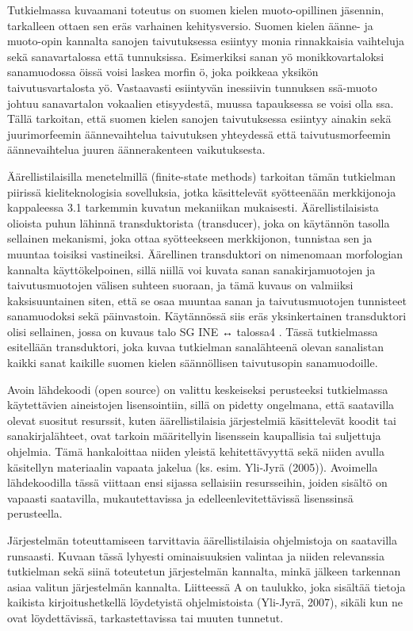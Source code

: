 \documentclass[free]{flammie}
\begin{document}
Tutkielmassa kuvaamani toteutus
on suomen kielen muoto-opillinen jäsennin, tarkalleen ottaen sen eräs varhainen
kehitysversio. Suomen kielen äänne- ja muoto-opin kannalta sanojen taivutuksessa
esiintyy monia rinnakkaisia vaihteluja sekä sanavartalossa että tunnuksissa.
Esimerkiksi sanan yö monikkovartaloksi sanamuodossa öissä voisi laskea morfin ö,
joka poikkeaa yksikön taivutusvartalosta yö. Vastaavasti esiintyvän inessiivin
tunnuksen ssä-muoto johtuu sanavartalon vokaalien etisyydestä, muussa
tapauksessa se voisi olla ssa. Tällä tarkoitan, että suomen kielen sanojen
taivutuksessa esiintyy ainakin sekä juurimorfeemin äännevaihtelua taivutuksen
yhteydessä että taivutusmorfeemin äännevaihtelua juuren äännerakenteen
vaikutuksesta.

Äärellistilaisilla menetelmillä (finite-state methods) tarkoitan
tämän tutkielman piirissä kieliteknologisia sovelluksia, jotka käsittelevät
syötteenään merkkijonoja kappaleessa 3.1 tarkemmin kuvatun mekaniikan
mukaisesti. Äärellistilaisista olioista puhun lähinnä transduktorista
(transducer), joka on käytännön tasolla sellainen mekanismi, joka ottaa
syötteekseen merkkijonon, tunnistaa sen ja muuntaa toisiksi vastineiksi.
Äärellinen transduktori on nimenomaan morfologian kannalta käyttökelpoinen,
sillä niillä voi kuvata sanan sanakirjamuotojen ja taivutusmuotojen välisen
suhteen suoraan, ja tämä kuvaus on valmiiksi kaksisuuntainen siten, että se osaa
muuntaa sanan ja taivutusmuotojen tunnisteet sanamuodoksi sekä päinvastoin.
Käytännössä siis eräs yksinkertainen transduktori olisi sellainen, jossa on
kuvaus talo SG INE ↔ talossa4 . Tässä tutkielmassa esitellään transduktori, joka
kuvaa tutkielman sanalähteenä olevan sanalistan kaikki sanat kaikille suomen
kielen säännöllisen taivutusopin sanamuodoille.

Avoin lähdekoodi (open source)
on valittu keskeiseksi perusteeksi tutkielmassa käytettävien aineistojen
lisensointiin, sillä on pidetty ongelmana, että saatavilla olevat suositut
resurssit, kuten äärellistilaisia järjestelmiä käsittelevät koodit tai
sanakirjalähteet, ovat tarkoin määritellyin lisenssein kaupallisia tai
suljettuja ohjelmia. Tämä hankaloittaa niiden yleistä kehitettävyyttä sekä
niiden avulla käsitellyn materiaalin vapaata jakelua (ks. esim. Yli-Jyrä
(2005)). Avoimella lähdekoodilla tässä viittaan ensi sijassa sellaisiin
resursseihin, joiden sisältö on vapaasti saatavilla, mukautettavissa ja
edelleenlevitettävissä lisenssinsä perusteella.

Järjestelmän toteuttamiseen tarvittavia äärellistilaisia ohjelmistoja on
saatavilla runsaasti. Kuvaan tässä lyhyesti ominaisuuksien valintaa ja niiden
relevanssia tutkielman sekä siinä toteutetun järjestelmän kannalta, minkä
jälkeen tarkennan asiaa valitun järjestelmän kannalta. Liitteessä A on taulukko,
joka sisältää tietoja kaikista kirjoitushetkellä löydetyistä ohjelmistoista
(Yli-Jyrä, 2007), sikäli kun ne ovat löydettävissä, tarkastettavissa tai muuten
tunnetut.
\end{document}

